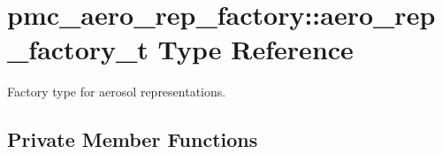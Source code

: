 \hypertarget{structpmc__aero__rep__factory_1_1aero__rep__factory__t}{}\section{pmc\+\_\+aero\+\_\+rep\+\_\+factory\+:\+:aero\+\_\+rep\+\_\+factory\+\_\+t Type Reference}
\label{structpmc__aero__rep__factory_1_1aero__rep__factory__t}


Factory type for aerosol representations.  


\subsection*{Private Member Functions}
